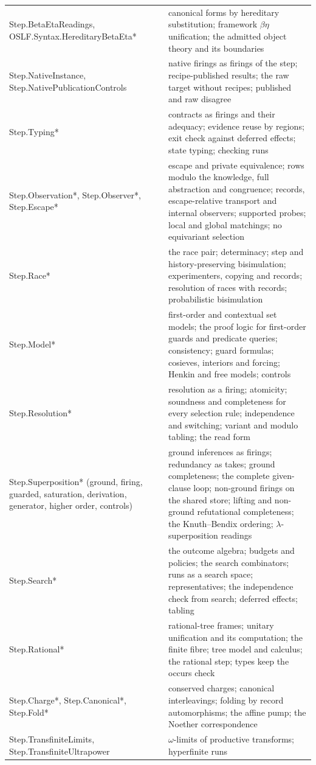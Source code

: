 \documentclass[11pt]{article}
\theoremstyle{remark}
\newcommand{\lean}[1]{{\ttfamily\def\_{\textunderscore\allowbreak}#1}}
\begin{document}
{\begin{longtable}{@{}L{0.37\textwidth}L{0.58\textwidth}@{}}
\lean{Step.BetaEtaReadings}, \lean{OSLF.Syntax.HereditaryBetaEta*} & canonical forms by hereditary substitution; framework $\beta\eta$ unification; the admitted object theory and its boundaries \\
\lean{Step.NativeInstance}, \lean{Step.NativePublicationControls} & native firings as firings of the step; recipe-published results; the raw target without recipes; published and raw disagree \\
\lean{Step.Typing*} & contracts as firings and their adequacy; evidence reuse by regions; exit check against deferred effects; state typing; checking runs \\
\lean{Step.Observation*}, \lean{Step.Observer*}, \lean{Step.Escape*} & escape and private equivalence; rows modulo the knowledge, full abstraction and congruence; records, escape-relative transport and internal observers; supported probes; local and global matchings; no equivariant selection \\
\lean{Step.Race*} & the race pair; determinacy; step and history-preserving bisimulation; experimenters, copying and records; resolution of races with records; probabilistic bisimulation \\
\lean{Step.Model*} & first-order and contextual set models; the proof logic for first-order guards and predicate queries; consistency; guard formulas; cosieves, interiors and forcing; Henkin and free models; controls \\
\lean{Step.Resolution*} & resolution as a firing; atomicity; soundness and completeness for every selection rule; independence and switching; variant and modulo tabling; the read form \\
\lean{Step.Superposition*} (ground, firing, guarded, saturation, derivation, generator, higher order, controls) & ground inferences as firings; redundancy as takes; ground completeness; the complete given-clause loop; non-ground firings on the shared store; lifting and non-ground refutational completeness; the Knuth--Bendix ordering; $\lambda$-superposition readings \\
\lean{Step.Search*} & the outcome algebra; budgets and policies; the search combinators; runs as a search space; representatives; the independence check from search; deferred effects; tabling \\
\lean{Step.Rational*} & rational-tree frames; unitary unification and its computation; the finite fibre; tree model and calculus; the rational step; types keep the occurs check \\
\lean{Step.Charge*}, \lean{Step.Canonical*}, \lean{Step.Fold*} & conserved charges; canonical interleavings; folding by record automorphisms; the affine pump; the Noether correspondence \\
\lean{Step.TransfiniteLimits}, \lean{Step.TransfiniteUltrapower} & $\omega$-limits of productive transforms; hyperfinite runs \\
\bottomrule
\end{longtable}
}
\end{document}

